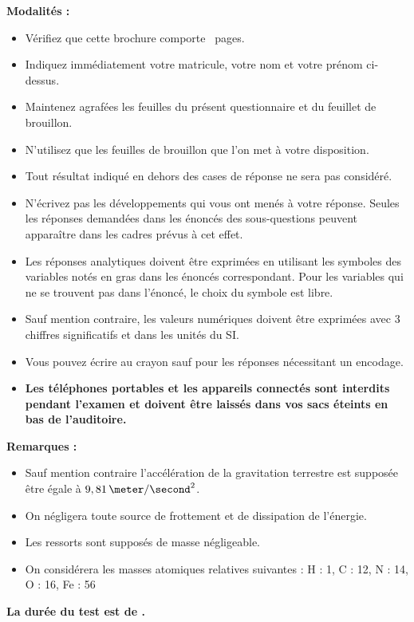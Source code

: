 \noindent\textbf{Modalités :}\\
\begin{itemize}
	\item Vérifiez que cette brochure comporte \nbpages ~pages.
	\item Indiquez immédiatement votre matricule, votre nom et votre prénom ci-dessus.
	\item Maintenez agrafées les feuilles du présent questionnaire et du feuillet de brouillon.
	\item N’utilisez que les feuilles de brouillon que l’on met à votre disposition.
	\item Tout résultat indiqué en dehors des cases de réponse ne sera pas considéré.
	\item N'écrivez pas les développements qui vous ont menés à votre
	réponse. Seules les réponses demandées dans les énoncés des sous-questions peuvent apparaître dans les cadres prévus à cet effet.
	\item Les réponses analytiques doivent être exprimées en utilisant les symboles des variables
	notés en gras dans les énoncés correspondant. Pour les variables qui ne se trouvent pas dans l'énoncé, le choix du symbole est libre.
	\item Sauf mention contraire, les valeurs numériques doivent être exprimées avec 3 chiffres significatifs et dans les unités du SI.
	\item Vous pouvez écrire au crayon sauf pour les réponses nécessitant un encodage.
	\item \textbf{Les téléphones portables et les appareils connectés sont interdits pendant l'examen et doivent être laissés dans vos sacs éteints en bas de l'auditoire.}
\end{itemize}

	\vspace{1cm}
\noindent\textbf{Remarques :}
\begin{itemize}
	\item Sauf mention contraire l’accélération de la gravitation terrestre est supposée être égale à $9,81 \, \meter / \second^2$.
	\item On négligera toute source de frottement et de dissipation de l’énergie.
	\item Les ressorts sont supposés de masse négligeable.
	\item On considérera les masses atomiques relatives suivantes : H : 1, C : 12, N : 14, O : 16, Fe : 56
\end{itemize}

\vspace{1cm}
\begin{center}
	\textbf{La durée du test est de \duree.}
\end{center}